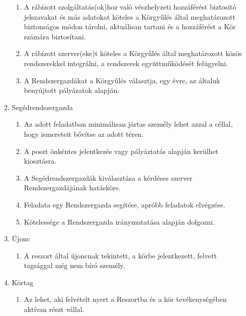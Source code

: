 \documentclass[12pt]{article}
\begin{document}
\begin{enumerate}
\begin{enumerate}
\begin{enumerate}
      \item A rábízott szolgáltatás(ok)hoz való vészhelyzeti hozzáférést biztosító jelszavakat és más adatokat köteles a Körgyűlés által meghatározott biztonságos módon tárolni, aktuálisan tartani és a hozzáférést a Kör számára biztosítani.

      \item A rábízott szerver(eke)t köteles a Körgyűlés által meghatározott közös rendszerekkel integrálni, a rendszerek együttműködését felügyelni.

      \item A Rendszergazdákat a Körgyűlés választja, egy évre, az általuk benyújtott pályázatok alapján.
    \end{enumerate} %

  \item Segédrendszergazda
    \begin{enumerate}
        \item Az adott feladatban minimálisan jártas személy lehet azzal a céllal, hogy
        ismereteit bővítse az adott téren.

        \item A poszt önkéntes jelentkezés vagy pályáztatás alapján kerülhet kiosztásra.

        \item A Segédrendszergazdák kiválasztása a kérdéses szerver Rendszergazdájának
        hatásköre.

        \item Feladata egy Rendszergazda segítése, apróbb feladatok elvégzése.

        \item Kötelessége a Rendszergazda iránymutatása alapján dolgozni.
    \end{enumerate} %

  \item Újonc
    \begin{enumerate}
        \item A reszort által újoncnak tekintett, a körbe jelentkezett, felvett tagsággal még nem bíró személy.
    \end{enumerate}

  \item Körtag
    \begin{enumerate}
        \item Az lehet, aki felvételt nyert a Reszortba és a kör tevékenységében aktívan részt vállal.
    \end{enumerate}


\end{enumerate}
\end{enumerate}
\end{document}
